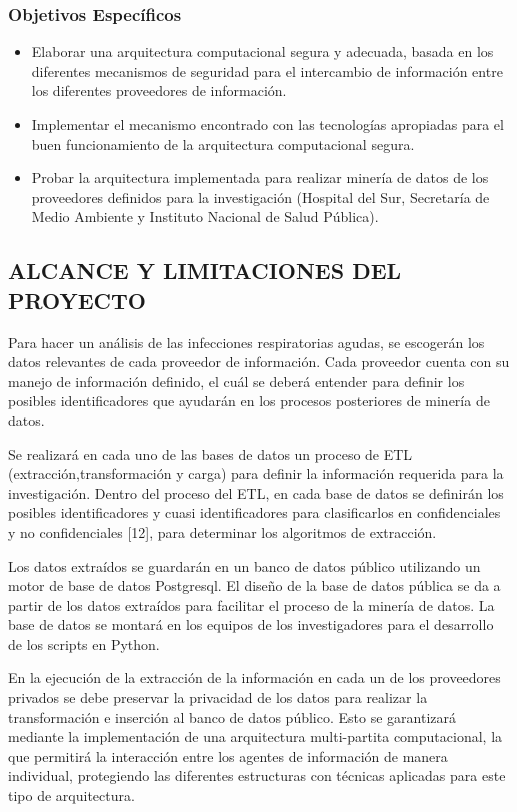 \documentclass[a4paper, 12pt, oneside]{article}
\theoremstyle{definition}
\theoremstyle{remark}
\begin{document}
\subsubsection{Objetivos Específicos}
\begin{itemize}
\item Elaborar una arquitectura computacional segura y adecuada, basada en los diferentes mecanismos de seguridad para el intercambio de información entre los diferentes proveedores de información.
\item Implementar el mecanismo encontrado con las tecnologías apropiadas para el buen funcionamiento de la arquitectura computacional segura.
\item Probar la arquitectura implementada para realizar minería de datos de los proveedores definidos para la investigación (Hospital del Sur, Secretaría de Medio Ambiente y Instituto Nacional de Salud Pública).

\end{itemize}

\subsection{ALCANCE Y LIMITACIONES DEL PROYECTO}

Para hacer un análisis de las infecciones respiratorias agudas, se escogerán los datos relevantes de cada proveedor de información. Cada proveedor cuenta con su  manejo de información definido, el cuál se deberá entender para definir los posibles identificadores que ayudarán en los procesos posteriores de minería de datos. 

Se realizará en cada uno de las bases de datos un proceso de ETL (extracción,transformación y carga) para definir la información requerida para la investigación. Dentro del proceso del ETL, en cada base de datos se definirán los posibles identificadores y cuasi identificadores para clasificarlos en confidenciales y no confidenciales [12], para determinar los algoritmos de extracción.

Los datos extraídos se guardarán en un banco de datos público utilizando un motor de base de datos Postgresql. El diseño de la base de datos pública se da a partir de los datos extraídos para facilitar el proceso de la minería de datos. La base de datos se montará en los equipos de los  investigadores para el desarrollo de los scripts en Python.

En la ejecución de la extracción de la información en cada un de los proveedores privados se debe preservar la privacidad de los datos para realizar la transformación e inserción al banco de datos público. Esto se garantizará mediante la implementación de una arquitectura multi-partita computacional, la que permitirá la interacción entre los agentes de información de manera individual, protegiendo las diferentes estructuras con técnicas aplicadas para este tipo de arquitectura.
\end{document}
